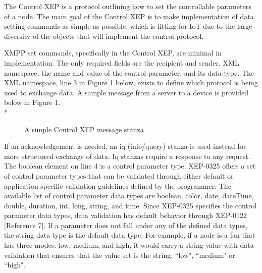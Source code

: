 The Control XEP is a protocol outlining how to set the controllable parameters 
of a node. The main goal of the Control XEP is 
to make implementation of data setting commands as simple as possible, which is 
fitting for IoT due to the large diversity of the objects that will implement 
the control protocol.

XMPP set commands, specifically in the Control XEP, are minimal in implementation. 
The only required fields are the recipient and sender, XML namespace, the name 
and value of the control parameter, and its data type. The XML namespace, line 
3 in Figure 1 below, exists to define which protocol is being used to 
exchange data. A sample message from a server to a device is provided below in 
Figure 1.\\*
\begin{figure}
\caption{A simple Control XEP message stanza}

\end{figure}

If an acknowledgement is needed, an iq (info/query) stanza is used instead for more structured exchange of data\cite{rfc6120}. Iq stanzas require a response to any request.\\
The boolean element on line 4 is a control parameter type. XEP-0325 offers a set of control parameter types that can be validated through either default or application specific validation guidelines defined by the programmer. The available list of control parameter data types are boolean, color, date, dateTime, double, duration, int, long, string, and time. Since XEP-0325 specifies the control parameter data types, data validation has default behavior through XEP-0122 [Reference 7]. If a parameter does not fall under any of the defined data types, the string data type is the default data type. For example, if a node is a fan that has three modes: low, medium, and high, it would carry a string value with data validation that ensures that the value set is the string:  ``low",  ``medium" or  ``high".\\

